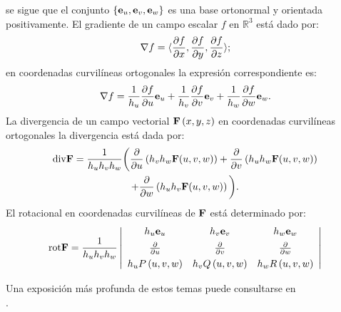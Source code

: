 se sigue que el conjunto  $\{ \mathbf{e}_{u},\mathbf{e}_{v},\mathbf{e}_{w} \}$
es una base ortonormal y orientada positivamente.
El gradiente de un campo escalar $f$ en $\mathbb{R}^{3}$ está dado por:
\[\nabla f=\langle \frac{\partial f}{\partial x},\frac{\partial f}{\partial y},
\frac{\partial f}{\partial z}\rangle;\]
en coordenadas curvilíneas ortogonales la expresión correspondiente es:
\[\nabla f= \frac{1}{h_{u}}\frac{\partial f}{\partial u}\mathbf{e}_{u}+\frac{1}{h_{v}}\frac{\partial f}{\partial v}\mathbf{e}_{v}+\frac{1}{h_{w}}\frac{\partial f}{\partial w}\mathbf{e}_{w}.\]
La divergencia de un campo vectorial ${\bf F}\left(x,y,z\right)$
en coordenadas curvilíneas ortogonales la divergencia está dada por:
\begin{multline*}
{\rm div}{\bf F}=\frac{1}{h_{u}h_{v}h_{w}}\bigg(
\frac{\partial}{\partial u} \left(h_{v}h_{w}{\bf F}(u,v,w)\right)
+\frac{\partial}{\partial v}\left(h_{u}h_{w}{\bf F}(u,v,w) \right) \\
+\frac{\partial}{\partial w}\left(h_{u}h_{v}{\bf F}(u,v,w) \right) \bigg).
\end{multline*}
El rotacional en coordenadas curvilíneas  de ${\bf F}$ está determinado por:
{\small
\[{\rm rot}{\bf F}=\frac{1}{h_{u}h_{v}h_{w}}\left\vert
\begin{array}{ccc}
h_{u}\mathbf{e}_{u} & h_{v}\mathbf{e}_{v} & h_{w}\mathbf{e}_{w} \\[0.15cm]
\frac{\partial }{\partial u} & \frac{\partial }{\partial v} & \frac{\partial
}{\partial w} \\[0.15cm]
h_{u}P\left( u,v,w\right)  & h_{v}Q\left( u,v,w\right)  & h_{w}R\left(
u,v,w\right)
\end{array} \right\vert\]
}

Una exposición más profunda de estos temas puede consultarse en \\ \cite{poljanin_handbook_2007}.


